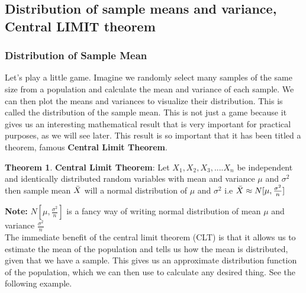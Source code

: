 \documentclass[12pt,a4paper]{article}
\theoremstyle{example}
\theoremstyle{definition}
\theoremstyle{theorem}
\newtheorem{theorem}{Theorem}
\begin{document}
\subsection{Distribution of sample means and variance, Central LIMIT theorem}
\subsubsection{Distribution of Sample Mean }
Let's play a little game. Imagine we randomly select many samples of the same size from a population and calculate the mean and variance of each sample. We can then plot the means and variances to visualize their distribution. This is called the distribution of the sample mean. This is not just a game because it gives us an interesting mathematical result that is very important for practical purposes, as we will see later. This result is so important that it has been titled a theorem, famous \textbf{Central Limit Theorem}.
\begin{theorem}{\textbf{Central Limit Theorem}}:
Let $X_1,X_2,X_3,....X_n$ be independent and identically distributed random variables with mean and variance $\mu$ and $\sigma^2$ then sample mean $\Bar{X}$ will a normal distribution of $\mu$ and $\sigma^2$ i.e $\Bar{X}\approx N[\mu,\frac{\sigma^2}{n}]$

    
\end{theorem}
\textbf{Note:} {$N[\mu,\frac{\sigma^2}{n}]$ is a fancy way of writing normal distribution of mean $\mu$ and variance $\frac{\sigma^2}{n}$}\\
The immediate benefit of the central limit theorem (CLT) is that it allows us to estimate the mean of the population and tells us how the mean is distributed, given that we have a sample. This gives us an approximate distribution function of the population, which we can then use to calculate any desired thing. See the following example.

\end{document}
